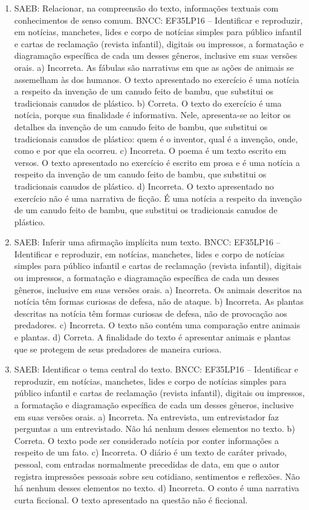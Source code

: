 \begin{enumerate}
\item
SAEB: Relacionar, na compreensão do texto, informações textuais com
conhecimentos de senso comum.
BNCC: EF35LP16 -- Identificar e reproduzir, em notícias, manchetes, lides
e corpo de notícias simples para público infantil e cartas de reclamação
(revista infantil), digitais ou impressos, a formatação e diagramação
específica de cada um desses gêneros, inclusive em suas versões orais.
a)  Incorreta. As fábulas são narrativas em que as ações de animais se 
assemelham às dos humanos. O texto apresentado no exercício é uma notícia 
a respeito da invenção de um canudo feito de bambu, que substitui os 
tradicionais canudos de plástico.  
b)  Correta. O texto do exercício é uma notícia, porque sua finalidade é
informativa. Nele, apresenta-se ao leitor os detalhes da invenção de um 
canudo feito de bambu, que substitui os tradicionais canudos de plástico:
quem é o inventor, qual é a invenção, onde, como e por que ela ocorreu.
c)  Incorreta. O poema é um texto escrito em versos. O texto apresentado 
no exercício é escrito em prosa e é uma notícia a respeito da invenção de
um canudo feito de bambu, que substitui os tradicionais canudos de 
plástico.   
d)  Incorreta. O texto apresentado no exercício não é uma narrativa de 
ficção. É uma notícia a respeito da invenção de um canudo feito de bambu,
que substitui os tradicionais canudos de plástico.

\item
SAEB: Inferir uma afirmação implícita num texto.
BNCC: EF35LP16 -- Identificar e reproduzir, em notícias, manchetes, lides
e corpo de notícias simples para público infantil e cartas de reclamação
(revista infantil), digitais ou impressos, a formatação e diagramação
específica de cada um desses gêneros, inclusive em suas versões orais.
a) Incorreta. Os animais descritos na notícia têm formas curiosas de 
defesa, não de ataque. 
b) Incorreta. As plantas descritas na notícia têm formas curiosas de 
defesa, não de provocação aos predadores. 
c) Incorreta. O texto não contém uma comparação entre animais e plantas.  
d) Correta. A finalidade do texto é apresentar animais e plantas que se 
protegem de seus predadores de maneira curiosa.

\item
SAEB: Identificar o tema central do texto.
BNCC: EF35LP16 -- Identificar e reproduzir, em notícias, manchetes, lides
e corpo de notícias simples para público infantil e cartas de reclamação
(revista infantil), digitais ou impressos, a formatação e diagramação
específica de cada um desses gêneros, inclusive em suas versões orais.
a) Incorreta. Na entrevista, um entrevistador faz perguntas a um 
entrevistado. Não há nenhum desses elementos no texto. 
b) Correta. O texto pode ser considerado notícia por conter informações a 
respeito de um fato.
c) Incorreta. O diário é um texto de caráter privado, pessoal, com entradas
normalmente precedidas de data, em que o autor registra impressões pessoais
sobre seu cotidiano, sentimentos e reflexões. Não há nenhum desses
elementos no texto. 
d) Incorreta. O conto é uma narrativa curta ficcional. O texto apresentado 
na questão não é ficcional.
\end{enumerate}

